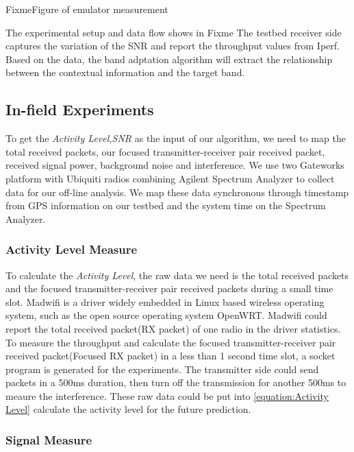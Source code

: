 Fixme{Figure of emulator measurement}

The experimental setup and data flow shows in Fixme %
The testbed receiver side captures the variation of the SNR and report the throughput values from Iperf\cite{Iperf}. Based on the data, the band adptation algorithm will extract the relationship between the contextual information and the target band.

\subsection{In-field Experiments}

To get the \emph{Activity Level,SNR} as the input of our algorithm, we need to map the total received packets, our focused transmitter-receiver pair received packet, received signal power, background noise and interference. We use two Gateworks platform with Ubiquiti radios combining Agilent Spectrum Analyzer to collect data for our off-line analysis. We map these data synchronous through timestamp from GPS information on our testbed and the system time on the Spectrum Analyzer.

\subsubsection{Activity Level Measure} 
To calculate the \emph{Activity Level}, the raw data we need is the total received packets and the focused transmitter-receiver pair received packets during a small time slot. Madwifi is a driver widely embedded in Linux based wireless operating system, such as the open source operating system OpenWRT\cite{Madwifi,Openwrt}. Madwifi could report the total received packet(RX packet) of one radio in the driver statistics.
To measure the throughput and calculate the focused transmitter-receiver pair received packet(Focused RX packet) in a less than 1 second time slot, a socket program is generated for the experiments. The transmitter side could send packets in a 500ms duration, then turn off the transmission for another 500ms to meaure the interference. These raw data could be put into \ref{equation:Activity Level} calculate the activity level for the future prediction.



\subsubsection{Signal Measure}

